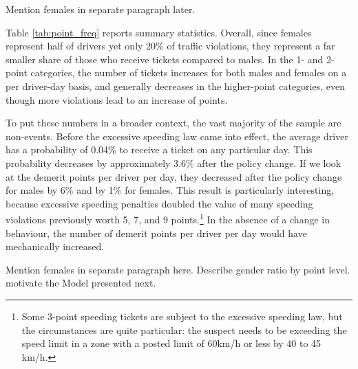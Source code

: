 

{\Large Mention females in separate paragraph later.}

Table \ref{tab:point_freq} reports summary statistics. 
Overall, since females represent half of drivers 
yet only 20\% of traffic violations, they represent a far smaller share 
of those who receive tickets compared to males. 
In the 1- and 2-point categories, the number of tickets increases 
for both males and females on a per driver-day basis, 
and generally decreases in the higher-point categories, 
even though more violations lead to an increase of points.

To put these numbers in a broader context, 
the vast majority of the sample are non-events. 
Before the excessive speeding law came into effect, 
the average driver has a probability of 0.04\% to receive a ticket 
on any particular day. 
This probability decreases by approximately 3.6\% after the policy change. 
If we look at the demerit points per driver per day, 
they decreased after the policy change for males by 6\% and by 1\% for females. 
This result is particularly interesting, 
because excessive speeding penalties doubled the value of many 
speeding violations previously worth 5, 7, and 9 points.\footnote{%
Some 3-point speeding tickets are subject to the excessive speeding law, 
but the circumstances are quite particular: 
the suspect needs to be exceeding the speed limit in a zone 
with a posted limit of 60km/h or less by 40 to 45 km/h.}
In the absence of a change in behaviour, 
the number of demerit points per driver per day 
would have mechanically increased. %


{\Large Mention females in separate paragraph here.
Describe gender ratio by point level.
motivate the Model presented next. }

